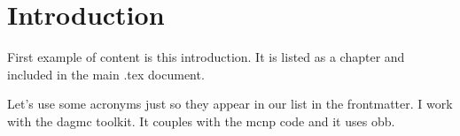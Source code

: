 \chapter{Introduction}

First example of content is this introduction.
It is listed as a chapter and included in the main .tex document.

Let's use some acronyms just so they appear in our list in the frontmatter.
I work with the \gls{dagmc} toolkit.
It couples with the \gls{mcnp} code and it uses \gls{obb}.
